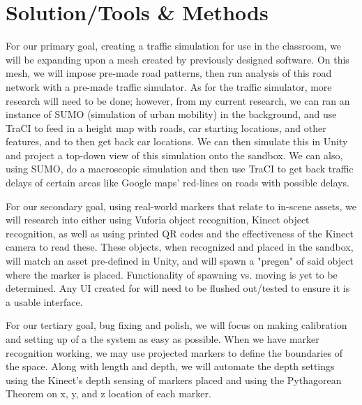 \documentclass[10pt,draftclsnofoot,onecolumn]{IEEEtran}
\begin{document}
\section{Solution/Tools \& Methods}
\begin{flushleft}
    \qquad For our primary goal, creating a traffic simulation for use in the classroom, we will be expanding upon a mesh created by previously designed software. On this mesh, we will impose pre-made road patterns, then run analysis of this road network with a pre-made traffic simulator. As for  the traffic simulator, more research will need to be done; however, from my current research, we can ran an instance of SUMO (simulation of urban mobility) in the background, and use TraCI to feed in a height map with roads, car starting locations, and other features, and to then get back car locations. We can then simulate this in Unity and project a top-down view of this simulation onto the sandbox. We can also, using SUMO, do a macroscopic simulation and then use TraCI to get back traffic delays of certain areas like Google maps' red-lines on roads with possible delays. 
\end{flushleft}
\begin{flushleft}
    \qquad For our secondary goal, using real-world markers that relate to in-scene assets, we will research into either using Vuforia object recognition, Kinect object recognition, as well as using printed QR codes and the effectiveness of the Kinect camera to read these. These objects, when recognized and placed in the sandbox, will match an asset pre-defined in Unity, and will spawn a "pregen" of said object where the marker is  placed. Functionality of spawning vs. moving is yet to be determined. Any UI created for will need to be flushed out/tested to ensure it is a usable interface. 
\end{flushleft}
\begin{flushleft}
    \qquad For our tertiary goal, bug fixing and polish, we will focus on making calibration and setting up of a the system as easy as possible. When we have marker recognition working, we may use projected markers to define the boundaries of the space. Along with length and depth, we will automate the depth settings using the Kinect's depth sensing of markers placed and using the Pythagorean Theorem on x, y, and z location of each marker. 
\end{flushleft}
\newpage
\end{document}
